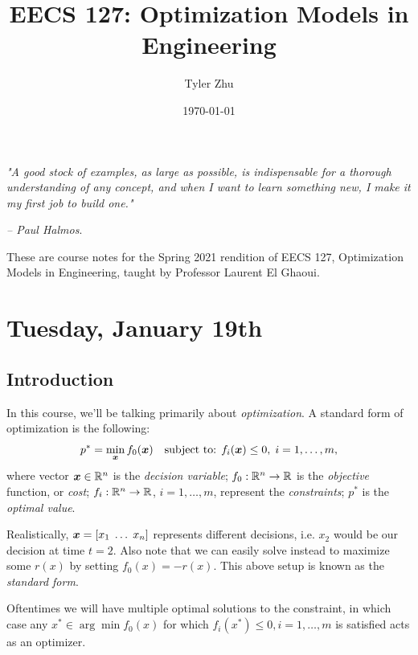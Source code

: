 \documentclass[11 pt]{scrartcl}
\begin{document}
 
\title{\Large EECS 127: Optimization Models in Engineering}
\author{\large Tyler Zhu}
\date{\large\today}

\maketitle 

\begin{center}
\begin{displayquote}
    \emph{"A good stock of examples, as large as possible, is indispensable for a thorough understanding of any concept, and when I want to learn something new, I make it my first job to build one."} \\ \begin{flushright} \emph{– Paul Halmos}.  \end{flushright}
\end{displayquote}
\end{center}


These are course notes for the Spring 2021 rendition of EECS 127, Optimization Models in Engineering, taught by Professor Laurent El Ghaoui.

\tableofcontents 

\newpage

\section{Tuesday, January 19th}
\subsection{Introduction}
In this course, we'll be talking primarily about \emph{optimization}. 
A standard form of optimization is the following: 
\[ p^* = \min_{\bm{x}} f_0({\bm{x}})\quad \text{subject to: } f_i({\bm{x}}) \leq 0,\; i=1,\dots, m,\] 
where 
\itemnum
    \ii vector ${\bm{x}}\in \mathbb R^n$ is the \emph{decision variable}; 
    \ii $f_0: \mathbb R^n \to \mathbb R$ is the \emph{objective} function, or \emph{cost}; 
    \ii $f_i: \mathbb R^n\to \mathbb R$, $i=1,\dots, m$, represent the \emph{constraints}; 
    \ii $p^*$ is the \emph{optimal value}. 
\itemend

Realistically, ${\bm{x}} = [x_1\; \dots\; x_n]$ represents different decisions, i.e. $x_2$ would be our decision at time $t=2$. 
Also note that we can easily solve instead to maximize some $r(x)$ by setting $f_0(x) = -r(x)$. 
This above setup is known as the \emph{standard form}. 

Oftentimes we will have multiple optimal solutions to the constraint, in which case any $x^* \in \arg\min f_0(x)$ for which $f_i(x^*) \leq 0, i=1, \dots, m$ is satisfied acts as an optimizer.
\end{document}
